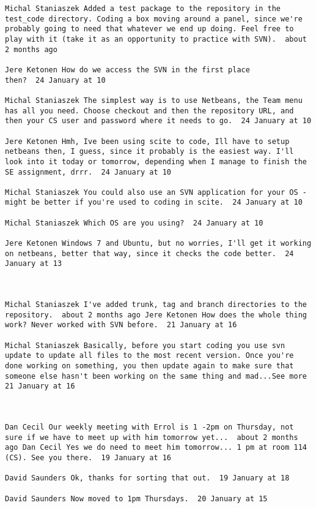 \begin{verbatim}
Michal Staniaszek Added a test package to the repository in the
test_code directory. Coding a box moving around a panel, since we're
probably going to need that whatever we end up doing. Feel free to
play with it (take it as an opportunity to practice with SVN).  about
2 months ago 

Jere Ketonen How do we access the SVN in the first place
then?  24 January at 10

Michal Staniaszek The simplest way is to use Netbeans, the Team menu
has all you need. Choose checkout and then the repository URL, and
then your CS user and password where it needs to go.  24 January at 10

Jere Ketonen Hmh, Ive been using scite to code, Ill have to setup
netbeans then, I guess, since it probably is the easiest way. I'll
look into it today or tomorrow, depending when I manage to finish the
SE assignment, drrr.  24 January at 10

Michal Staniaszek You could also use an SVN application for your OS -
might be better if you're used to coding in scite.  24 January at 10

Michal Staniaszek Which OS are you using?  24 January at 10

Jere Ketonen Windows 7 and Ubuntu, but no worries, I'll get it working
on netbeans, better that way, since it checks the code better.  24
January at 13



Michal Staniaszek I've added trunk, tag and branch directories to the
repository.  about 2 months ago Jere Ketonen How does the whole thing
work? Never worked with SVN before.  21 January at 16

Michal Staniaszek Basically, before you start coding you use svn
update to update all files to the most recent version. Once you're
done working on something, you then update again to make sure that
someone else hasn't been working on the same thing and mad...See more
21 January at 16



Dan Cecil Our weekly meeting with Errol is 1 -2pm on Thursday, not
sure if we have to meet up with him tomorrow yet...  about 2 months
ago Dan Cecil Yes we do need to meet him tomorrow... 1 pm at room 114
(CS). See you there.  19 January at 16

David Saunders Ok, thanks for sorting that out.  19 January at 18

David Saunders Now moved to 1pm Thursdays.  20 January at 15




\end{verbatim}
